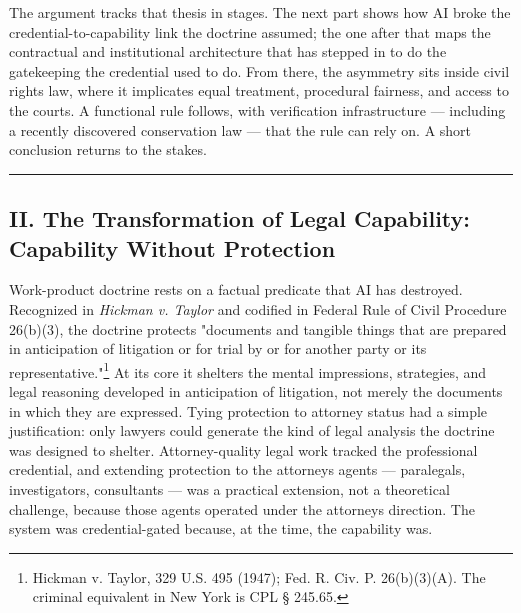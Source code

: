 \documentclass[
  12pt,
]{article}
\begin{document}
The argument tracks that thesis in stages. The next part shows how AI
broke the credential-to-capability link the doctrine assumed; the one
after that maps the contractual and institutional architecture that has
stepped in to do the gatekeeping the credential used to do. From there,
the asymmetry sits inside civil rights law, where it implicates equal
treatment, procedural fairness, and access to the courts. A functional
rule follows, with verification infrastructure --- including a recently
discovered conservation law --- that the rule can rely on. A short
conclusion returns to the stakes.

\begin{center}\rule{0.5\linewidth}{0.5pt}\end{center}

\subsection{II. The Transformation of Legal Capability: Capability
Without
Protection}\label{ii-the-transformation-of-legal-capability-capability-without-protection}

Work-product doctrine rests on a factual predicate that AI has
destroyed. Recognized in \emph{Hickman v. Taylor} and codified in
Federal Rule of Civil Procedure 26(b)(3), the doctrine protects
"documents and tangible things that are prepared in anticipation of
litigation or for trial by or for another party or its
representative."\footnote{Hickman v. Taylor, 329 U.S. 495 (1947); Fed.
  R. Civ. P. 26(b)(3)(A). The criminal equivalent in New York is CPL §
  245.65.} At its core it shelters the mental impressions, strategies,
and legal reasoning developed in anticipation of litigation, not merely
the documents in which they are expressed. Tying protection to attorney
status had a simple justification: only lawyers could generate the kind
of legal analysis the doctrine was designed to shelter. Attorney-quality
legal work tracked the professional credential, and extending protection
to the attorney\textquotesingle s agents --- paralegals, investigators,
consultants --- was a practical extension, not a theoretical challenge,
because those agents operated under the attorney\textquotesingle s
direction. The system was credential-gated because, at the time, the
capability was.
\end{document}
